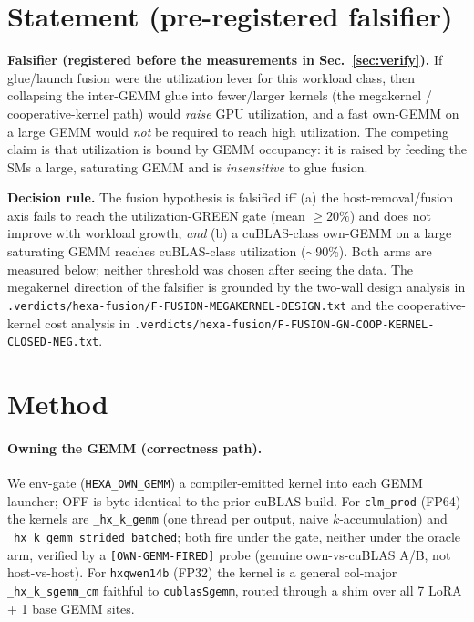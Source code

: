 \documentclass[11pt,a4paper]{article}
\newcommand{\vd}[1]{\texttt{.verdicts/hexa-fusion/#1.txt}}
\begin{document}
\section{Statement (pre-registered falsifier)}
\label{sec:statement}

\noindent\textbf{Falsifier (registered before the measurements in
Sec.~\ref{sec:verify}).}
If glue/launch fusion were the utilization lever for this workload class, then
collapsing the inter-GEMM glue into fewer/larger kernels (the megakernel /
cooperative-kernel path) would \emph{raise} GPU utilization, and a fast own-GEMM
on a large GEMM would \emph{not} be required to reach high utilization.
The competing claim is that utilization is bound by GEMM occupancy: it is raised
by feeding the SMs a large, saturating GEMM and is \emph{insensitive} to glue
fusion.

\noindent\textbf{Decision rule.} The fusion hypothesis is falsified iff (a) the
host-removal/fusion axis fails to reach the utilization-GREEN gate (mean
$\geq 20\%$) and does not improve with workload growth, \emph{and} (b) a
cuBLAS-class own-GEMM on a large saturating GEMM reaches cuBLAS-class utilization
($\sim$90\%). Both arms are measured below; neither threshold was chosen after
seeing the data. The megakernel direction of the falsifier is grounded by the
two-wall design analysis in \vd{F-FUSION-MEGAKERNEL-DESIGN} and the
cooperative-kernel cost analysis in \vd{F-FUSION-GN-COOP-KERNEL-CLOSED-NEG}.

\section{Method}
\label{sec:method}

\paragraph{Owning the GEMM (correctness path).}
We env-gate (\texttt{HEXA\_OWN\_GEMM}) a compiler-emitted kernel into each GEMM
launcher; OFF is byte-identical to the prior cuBLAS build. For \texttt{clm\_prod}
(FP64) the kernels are \texttt{\_hx\_k\_gemm} (one thread per output, naive
$k$-accumulation) and \texttt{\_hx\_k\_gemm\_strided\_batched}; both fire under the
gate, neither under the oracle arm, verified by a \texttt{[OWN-GEMM-FIRED]} probe
(genuine own-vs-cuBLAS A/B, not host-vs-host). For \texttt{hxqwen14b} (FP32) the
kernel is a general col-major \texttt{\_hx\_k\_sgemm\_cm} faithful to
\texttt{cublasSgemm}, routed through a shim over all 7 LoRA + 1 base GEMM sites.
\end{document}

